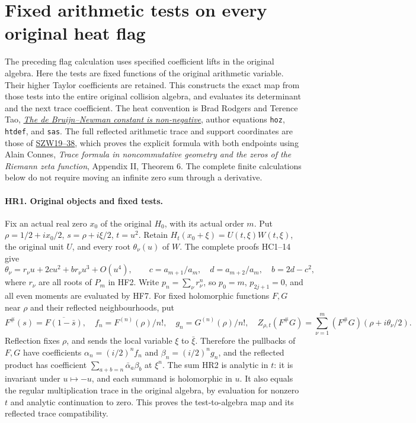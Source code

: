 \section{Fixed arithmetic tests on every original heat flag}
\label{sec:fixed-arithmetic-heat-flags}

The preceding flag calculation uses specified coefficient lifts in the
original algebra. Here the tests are fixed functions of the original
arithmetic variable. Their higher Taylor coefficients are retained.
This constructs the exact map from those tests into the entire original
collision algebra, and evaluates its determinant and the next trace
coefficient. The heat convention is Brad Rodgers and Terence Tao,
\href{https://arxiv.org/abs/1801.05914v5}{\emph{The de Bruijn--Newman
constant is non-negative}}, author equations \texttt{hoz},
\texttt{htdef}, and \texttt{sas}. The full reflected arithmetic trace
and support coordinates are those of
\href{https://github.com/KokunoYumeto/zeta-function-research-reader/blob/5a89872598df0902b7c1393cf8e4692ca3010a95/workbenches/splitzero-tandem/branches/tau-zero-prime-positivity/SUPPORTED_ZERO_PRIME_WEIL_DERIVATION.md}{SZW19--38},
which proves the explicit formula with both endpoints using Alain
Connes, \emph{Trace formula in noncommutative geometry and the zeros
of the Riemann zeta function}, Appendix II, Theorem 6.
The complete finite calculations below do not require moving an
infinite zero sum through a derivative.

\paragraph{HR1. Original objects and fixed tests.}
Fix an actual real zero $x_0$ of the original $H_0$, with its actual
order $m$. Put $\rho=1/2+ix_0/2$, $s=\rho+i\xi/2$, $t=u^2$.
Retain $H_t(x_0+\xi)=U(t,\xi)W(t,\xi)$, the original unit $U$,
and every root $\theta_\nu(u)$ of $W$. The complete proofs HC1--14
give
\[
 \theta_\nu=r_\nu u+2cu^2+b r_\nu u^3+O(u^4),\qquad
 c=a_{m+1}/a_m,\quad d=a_{m+2}/a_m,\quad b=2d-c^2,
 \tag{HR1}
\]
where $r_\nu$ are all roots of $P_m$ in HF2. Write
$p_n=\sum_\nu r_\nu^n$, so $p_0=m$, $p_{2j+1}=0$,
and all even moments are evaluated by HF7.
For fixed holomorphic functions $F,G$ near $\rho$ and their
reflected neighbourhoods, put
\[
 F^\#(s)=\overline{F(1-\bar s)},\quad
 f_n=F^{(n)}(\rho)/n!,\quad g_n=G^{(n)}(\rho)/n!,
 \quad
 Z_{\rho,t}(F^\#G)=\sum_{\nu=1}^m
   (F^\#G)(\rho+i\theta_\nu/2).
 \tag{HR2}
\]
Reflection fixes $\rho$, and sends the local variable
$\xi$ to $\bar\xi$. Therefore the pullbacks of $F,G$ have
coefficients $\alpha_n=(i/2)^n f_n$ and
$\beta_n=(i/2)^n g_n$, and the reflected product has coefficient
$\sum_{a+b=n}\bar\alpha_a\beta_b$ at $\xi^n$.
The sum HR2 is analytic in $t$: it is invariant under $u\mapsto-u$,
and each summand is holomorphic in $u$. It also equals the regular
multiplication trace in the original algebra, by evaluation for
nonzero $t$ and analytic continuation to zero. This proves the
test-to-algebra map and its reflected trace compatibility.

